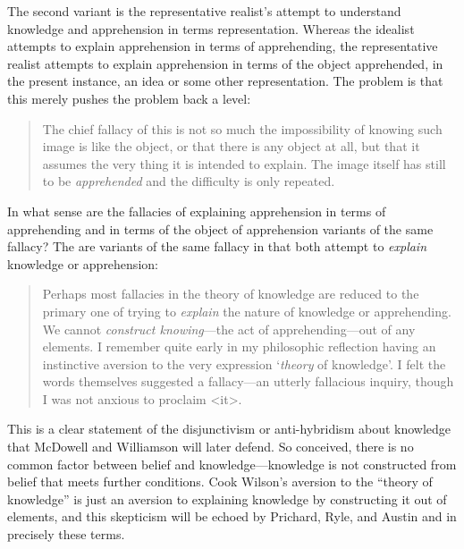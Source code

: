 \documentclass[11pt]{article}
\begin{document}
The second variant is the representative realist's attempt to understand knowledge and apprehension in terms representation. Whereas the idealist attempts to explain apprehension in terms of apprehending, the representative realist attempts to explain apprehension in terms of the object apprehended, in the present instance, an idea or some other representation. The problem is that this merely pushes the problem back a level:
\begin{quote}
	The chief fallacy of this is not so much the impossibility of knowing such image is like the object, or that there is any object at all, but that it assumes the very thing it is intended to explain. The image itself has still to be \emph{apprehended} and the difficulty is only repeated.
\end{quote}

In what sense are the fallacies of explaining apprehension in terms of apprehending and in terms of the object of apprehension variants of the same fallacy? The are variants of the same fallacy in that both attempt to \emph{explain} knowledge or apprehension:
\begin{quote}
	Perhaps most fallacies in the theory of knowledge are reduced to the primary one of trying to \emph{explain} the nature of knowledge or apprehending. We cannot \emph{construct knowing}---the act of apprehending---out of any elements. I remember quite early in my philosophic reflection having an instinctive aversion to the very expression `\emph{theory} of knowledge'. I felt the words themselves suggested a fallacy---an utterly fallacious inquiry, though I was not anxious to proclaim <it>.
\end{quote}
This is a clear statement of the disjunctivism or anti-hybridism about knowledge that McDowell and Williamson will later defend. So conceived, there is no common factor between belief and knowledge---knowledge is not constructed from belief that meets further conditions. Cook Wilson's aversion to the ``theory of knowledge'' is just an aversion to explaining knowledge by constructing it out of elements, and this skepticism will be echoed by Prichard, Ryle, and Austin and in precisely these terms.
\end{document}

